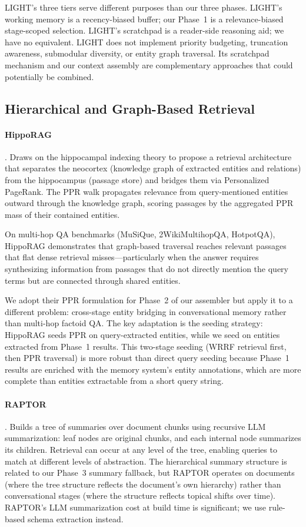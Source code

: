 \documentclass[11pt]{article}
\begin{document}
LIGHT's three tiers serve different purposes than our three phases.
LIGHT's working memory is a recency-biased buffer; our Phase~1 is a
relevance-biased stage-scoped selection.  LIGHT's scratchpad is a
reader-side reasoning aid; we have no equivalent.  LIGHT does not
implement priority budgeting, truncation awareness, submodular
diversity, or entity graph traversal.  Its scratchpad mechanism and
our context assembly are complementary approaches that could
potentially be combined.

\subsection{Hierarchical and Graph-Based Retrieval}
\label{sec:hierarchical}

\paragraph{HippoRAG} \citep{Gutierrez2024}.
Draws on the hippocampal indexing theory \citep{Teyler2007} to propose
a retrieval architecture that separates the neocortex (knowledge graph
of extracted entities and relations) from the hippocampus (passage
store) and bridges them via Personalized PageRank.  The PPR walk
propagates relevance from query-mentioned entities outward through
the knowledge graph, scoring passages by the aggregated PPR mass of
their contained entities.

On multi-hop QA benchmarks (MuSiQue, 2WikiMultihopQA, HotpotQA),
HippoRAG demonstrates that graph-based traversal reaches relevant
passages that flat dense retrieval misses---particularly when the
answer requires synthesizing information from passages that do not
directly mention the query terms but are connected through shared
entities.

We adopt their PPR formulation for Phase~2 of our assembler but
apply it to a different problem: cross-stage entity bridging in
conversational memory rather than multi-hop factoid QA.  The key
adaptation is the seeding strategy: HippoRAG seeds PPR on
query-extracted entities, while we seed on entities extracted from
Phase~1 results.  This two-stage seeding (WRRF retrieval first, then
PPR traversal) is more robust than direct query seeding because
Phase~1 results are enriched with the memory system's entity
annotations, which are more complete than entities extractable from
a short query string.

\paragraph{RAPTOR} \citep{Sarthi2024}.
Builds a tree of summaries over document chunks using recursive LLM
summarization: leaf nodes are original chunks, and each internal node
summarizes its children.  Retrieval can occur at any level of the
tree, enabling queries to match at different levels of abstraction.
The hierarchical summary structure is related to our Phase~3 summary
fallback, but RAPTOR operates on documents (where the tree structure
reflects the document's own hierarchy) rather than conversational
stages (where the structure reflects topical shifts over time).
RAPTOR's LLM summarization cost at build time is significant; we use
rule-based schema extraction instead.
\end{document}
